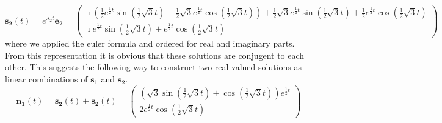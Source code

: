 \documentclass[10pt,a4paper]{article}
\begin{document}
\[
\mathbf{s_2}(t)=e^{\lambda_2 t}\mathbf{e_2}=\left(\begin{matrix}\mathbf{\imath} \left(\frac{1}{2} e^{\frac{1}{2} t} \sin{\left (\frac{1}{2} \sqrt{3} t \right )} - \frac{1}{2} \sqrt{3} e^{\frac{1}{2} t} \cos{\left (\frac{1}{2} \sqrt{3} t \right )}\right) + \frac{1}{2} \sqrt{3} e^{\frac{1}{2} t} \sin{\left (\frac{1}{2} \sqrt{3} t \right )} + \frac{1}{2} e^{\frac{1}{2} t} \cos{\left (\frac{1}{2} \sqrt{3} t \right )}\\\mathbf{\imath} e^{\frac{1}{2} t} \sin{\left (\frac{1}{2} \sqrt{3} t \right )} + e^{\frac{1}{2} t} \cos{\left (\frac{1}{2} \sqrt{3} t \right )}\end{matrix}\right)
\]
where we applied the euler formula and ordered for real and imaginary parts. From this representation it is obvious that these solutions are conjugent to each other. This suggests the following way to construct two real valued solutions as linear combinations of $ \mathbf{s_1} $ and $ \mathbf{s_2} $.
\[
\mathbf{n_1}(t)=  \mathbf{s_2}(t)+\mathbf{s_2}(t) =\left(\begin{matrix}\left(\sqrt{3} \sin{\left (\frac{1}{2} \sqrt{3} t \right )} + \cos{\left (\frac{1}{2} \sqrt{3} t \right )}\right) e^{\frac{1}{2} t}\\2 e^{\frac{1}{2} t} \cos{\left (\frac{1}{2} \sqrt{3} t \right )}\end{matrix}\right)
\]
\end{document}
